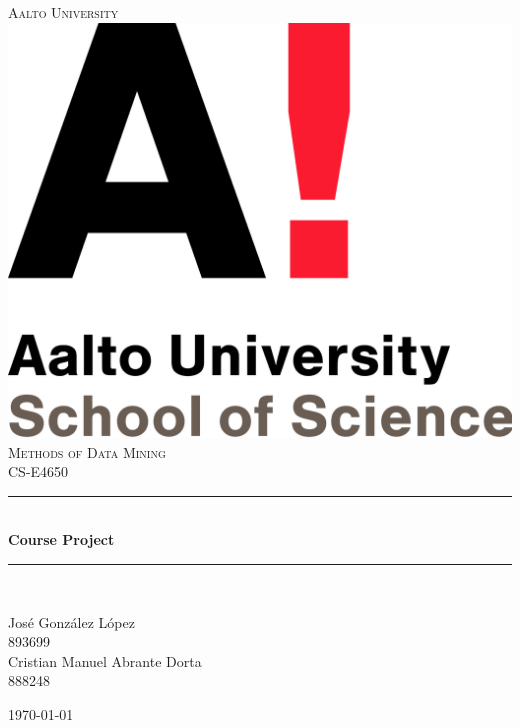 \documentclass[12pt]{article}
\begin{document}
\begin{titlepage}

\newcommand{\HRule}{\rule{\linewidth}{0.5mm}} %

\center %
 

\textsc{\LARGE Aalto University}\\[1.5cm] %
\includegraphics[scale=.1]{logo.png}\\[1cm] %
\textsc{\Large Methods of Data Mining}\\[0.5cm] %
\textsc{\large CS-E4650}\\[0.5cm] %

\HRule \\[0.4cm]
{ \huge \bfseries Course Project}\\[0.4cm] %
\HRule \\[1.0cm]

\begin{center}
José González López \\
893699\\
Cristian Manuel Abrante Dorta\\
888248
\end{center}

{\large \today}\\[2cm] 

\vfill %

\end{titlepage}
\end{document}
